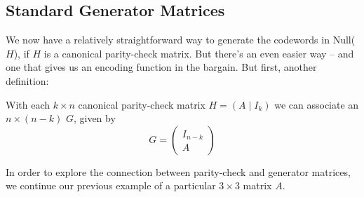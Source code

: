  
 \subsection{Standard Generator Matrices}
 
We now have a relatively straightforward way to generate the codewords in Null($H$), if $H$ is a canonical parity-check matrix. But there's an even easier way -- and one that gives us an encoding function in the bargain. But first, another definition: 

\begin{defn}\label{definition:algcodes:GeneratorMatrix}
With each $k \times n$ canonical parity-check matrix 
$H= (A \mid I_k)$
we can associate an $n \times
(n-k)$  $G$, given by 
\[
G =
\left(
 \begin{array}{c}
 I_{n-k} \\
A
 \end{array} \right)
\]
\end{defn}

In order to explore the connection between parity-check and generator matrices, we continue our previous example of a particular $3 \times 3$ matrix $A$.

